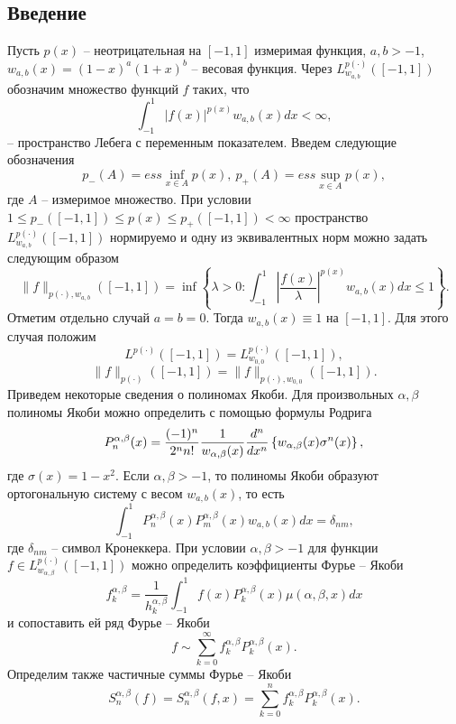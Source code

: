 \subsection{Введение}\label{Intro-Tadg}
Пусть $p(x)$ -- неотрицательная на $[-1,1]$ измеримая функция, $a,b>-1$, $w_{a,b}(x)=(1-x)^a(1+x)^b$ -- весовая функция. Через $L^{p(\cdot)}_{w_{a,b}}([-1,1])$ обозначим множество функций $f$ таких, что
\begin{equation}\label{s2-lpx-def-1}
  \int_{-1}^1|f(x)|^{p(x)}w_{a,b}(x)dx<\infty,
\end{equation}
-- пространство Лебега с переменным показателем. Введем следующие обозначения
$$p_-(A)=ess\inf_{x\in A}p(x),\ p_+(A)=ess\sup_{x\in A}p(x),$$
где $A$ -- измеримое множество.
 При условии $1\le p_-([-1,1])\le p(x)\le p_+([-1,1])<\infty$ пространство $L^{p(\cdot)}_{w_{a,b}}([-1,1])$ нормируемо \cite{tad-lpxtopology} и одну из эквивалентных норм можно задать следующим образом
\begin{equation}\label{s2-lpx-norm}
  \|f\|_{p(\cdot),w_{a,b}}([-1,1])=\inf\left\{\lambda>0:\int_{-1}^1\left|\frac{f(x)}\lambda\right|^{p(x)}w_{a,b}(x)dx\le1\right\}.
\end{equation}
Отметим отдельно случай $a=b=0$. Тогда $w_{a,b}(x)\equiv1$ на $[-1,1]$. Для этого случая положим $$L^{p(\cdot)}([-1,1])=L^{p(\cdot)}_{w_{0,0}}([-1,1]),$$
$$\|f\|_{p(\cdot)}([-1,1])=\|f\|_{p(\cdot),w_{0,0}}([-1,1]).$$
Приведем некоторые сведения о полиномах Якоби. Для произвольных $\alpha,\beta$ полиномы Якоби можно определить с помощью формулы Родрига
\begin{equation}\label{RodrigueFormula}
  P_n^{\alpha,\beta}(x) = {(-1)^n\over2^nn!}{1\over w_{\alpha,\beta}(x)}{d^n\over
dx^n} \left\{w_{\alpha,\beta}(x)\sigma^n(x)\right\},
\end{equation}
где $\sigma(x)=1-x^2$. Если $\alpha,\beta>-1$, то полиномы Якоби образуют ортогональную систему с весом  $w_{a,b}(x)$, то есть
\begin{equation}\label{JacobiOrthognality}
	\int_{-1}^1P_n^{\alpha,\beta}(x)P_m^{\alpha,\beta}(x)w_{a,b}(x)dx=\delta_{nm},
\end{equation}
где $\delta_{nm}$ -- символ Кронеккера.
При условии $\alpha,\beta>-1$ для функции $f\in L^{p(\cdot)}_{w_{\alpha,\beta}}([-1,1])$ можно определить коэффициенты Фурье -- Якоби
$$
f_k^{\alpha,\beta}=\frac{1}{h_k^{\alpha,\beta}}\int_{-1}^1f(x)P_k^{\alpha,\beta}(x)
\mu(\alpha,\beta,x)dx
$$
и сопоставить ей ряд Фурье -- Якоби
$$
f\sim \sum_{k=0}^\infty f_k^{\alpha,\beta}P_k^{\alpha,\beta}(x).
$$
Определим также частичные суммы Фурье -- Якоби
$$
S_n^{\alpha,\beta}(f)=S_n^{\alpha,\beta}(f,x)=\sum_{k=0}^nf_k^{\alpha,\beta}P_k^{\alpha,\beta}(x).
$$

